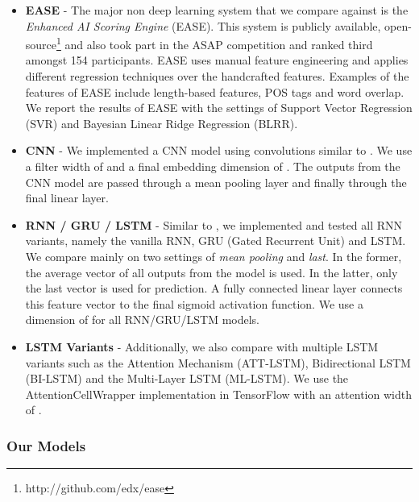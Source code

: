 \documentclass[letterpaper]{article}
\begin{document}
\begin{itemize}

\item \textbf{EASE} - The major non deep learning system that we compare against is the \textit{Enhanced AI Scoring Engine} (EASE). This system is publicly available, open-source\footnote{http://github.com/edx/ease} and also took part in the ASAP competition and ranked third amongst 154 participants. EASE uses manual feature engineering and applies different regression techniques over the handcrafted features. Examples of the features of EASE include length-based features, POS tags and word overlap. We report the results of EASE with the settings of Support Vector Regression (SVR) and Bayesian Linear Ridge Regression (BLRR). 


\item \textbf{CNN} - We implemented a CNN model using  convolutions similar to \cite{DBLP:conf/emnlp/TaghipourN16}. We use a filter width of  and a final embedding dimension of . The outputs from the CNN model are passed through a mean pooling layer and finally through the final linear layer. 

\item \textbf{RNN / GRU / LSTM} - Similar to \cite{DBLP:conf/emnlp/TaghipourN16}, we implemented and tested all RNN variants, namely the vanilla RNN, GRU (Gated Recurrent Unit) and LSTM. We compare mainly on two settings of \textit{mean pooling} and \textit{last}. In the former, the average vector of all outputs from the model is used. In the latter, only the last vector is used for prediction. A fully connected linear layer connects this feature vector to the final sigmoid activation function. We use a dimension of  for all RNN/GRU/LSTM models. 

\item \textbf{LSTM Variants} - Additionally, we also compare with multiple LSTM variants such as the Attention Mechanism (ATT-LSTM), Bidirectional LSTM (BI-LSTM) and the Multi-Layer LSTM (ML-LSTM). We use the AttentionCellWrapper implementation in TensorFlow with an attention width of .

\end{itemize}
\subsubsection{Our Models} 
\end{document}
